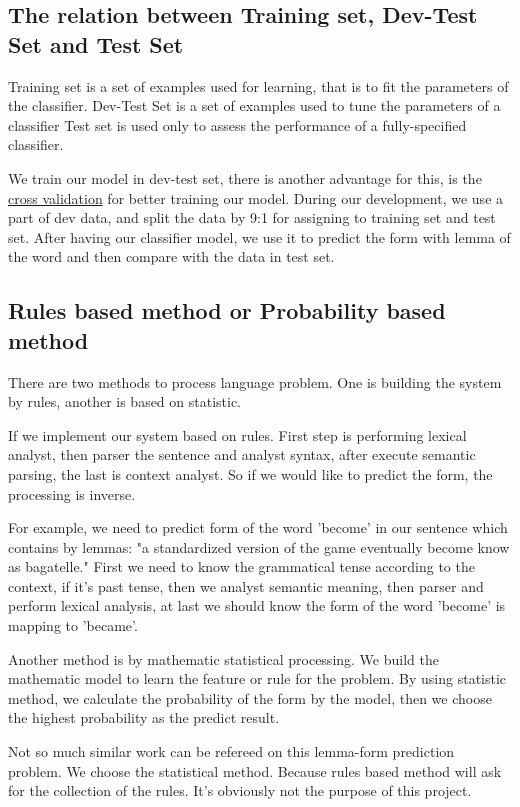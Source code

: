 \documentclass[a4paper]{article}
\begin{document}
\subsection{The relation between Training set, Dev-Test Set and Test Set}
Training set is a set of examples used for learning, that is to fit the parameters of the classifier. Dev-Test Set is a set of examples used to tune the parameters of a classifier Test set is used only to assess the performance of a fully-specified classifier.\cite{ripley_pattern_2007} 

We train our model in dev-test set, there is another advantage for this, is the \href{https://en.wikipedia.org/wiki/Cross-validation_(statistics)}{cross validation} for better training our model. During our development, we use a part of dev data, and split the data by 9:1 for assigning to training set and test set. After having our classifier model, we use it to predict the form with lemma of the word and then compare with the data in test set.

\subsection{Rules based method or Probability based method}

There are two methods to process language problem. One is building the system by rules, another is based on statistic.

If we implement our system based on rules. First step is performing lexical analyst, then parser the sentence and analyst syntax, after execute semantic parsing, the last is context analyst. So if we would like to predict the form, the processing is inverse. 

For example, we need to predict form of the word 'become' in our sentence which contains by lemmas: "a standardized version of the game eventually become know as bagatelle."
First we need to know the grammatical tense according to the context, if it's past tense, then we analyst semantic meaning, then parser and perform lexical analysis, at last we should know the form of the word 'become' is mapping to 'became'.

Another method is by mathematic statistical processing. We build the mathematic model to learn the feature or rule for the problem. By using statistic method, we calculate the probability of the form by the model, then we choose the highest probability as the predict result. 

Not so much similar work can be refereed on this lemma-form prediction problem. We choose the statistical method. Because rules based method will ask for the collection of the rules. It's obviously not the purpose of this project.
\end{document}
